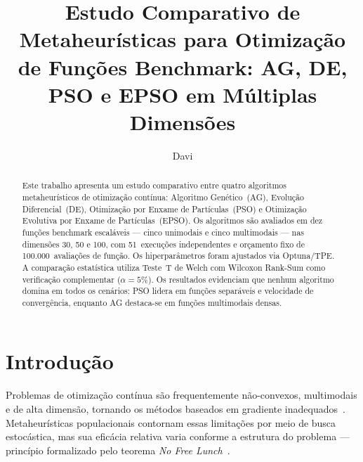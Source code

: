 \documentclass[runningheads]{llncs}
\begin{document}
\title{Estudo Comparativo de Metaheurísticas para Otimização
de Fun\c{c}\~{o}es Benchmark: AG, DE, PSO e EPSO
em M\'{u}ltiplas Dimens\~{o}es}


\author{Davi}


\maketitle

\begin{abstract}
Este trabalho apresenta um estudo comparativo entre quatro algoritmos
metaheurísticos de otimização contínua: Algoritmo Genético~(AG),
Evolução Diferencial~(DE), Otimização por Enxame de Partículas~(PSO)
e Otimização Evolutiva por Enxame de Partículas~(EPSO). Os algoritmos
são avaliados em dez funções benchmark escaláveis — cinco unimodais e
cinco multimodais — nas dimensões 30, 50 e 100, com 51~execuções
independentes e orçamento fixo de 100.000~avaliações de função.
Os hiperparâmetros foram ajustados via Optuna/TPE\@. A comparação
estatística utiliza Teste~T de Welch com Wilcoxon Rank-Sum como
verificação complementar ($\alpha=5\%$). Os resultados evidenciam
que nenhum algoritmo domina em todos os cenários: PSO lidera em
funções separáveis e velocidade de convergência, enquanto AG
destaca-se em funções multimodais densas.

\end{abstract}

\section{Introdução}
\label{sec:intro}

Problemas de otimização contínua são frequentemente não-convexos,
multimodais e de alta dimensão, tornando os métodos baseados em gradiente
inadequados~\cite{storn1997}. Metaheurísticas populacionais contornam
essas limitações por meio de busca estocástica, mas sua eficácia relativa
varia conforme a estrutura do problema — princípio formalizado pelo
teorema \emph{No Free Lunch}~\cite{wolpert1997}.
\end{document}
